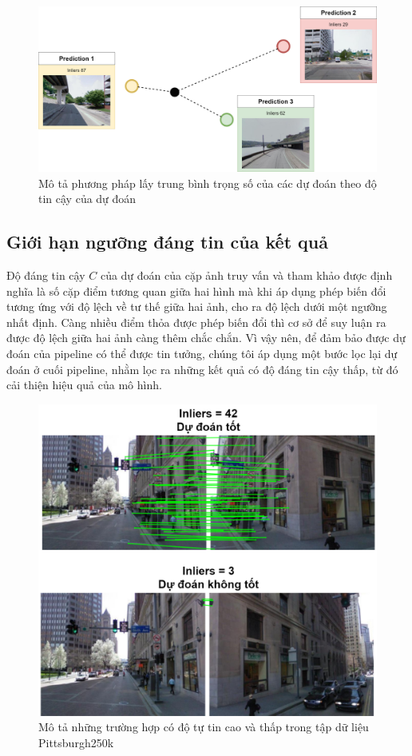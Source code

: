 \begin{figure}[H]
  \centering
  \includegraphics[width=\textwidth]{pics/Proposal/weighted.png}
  \caption[Trung bình trọng số theo inliers của dự đoán]{Mô tả phương pháp lấy trung bình trọng số của các dự đoán theo độ tin cậy của dự đoán}
\end{figure}

\subsection{Giới hạn ngưỡng đáng tin của kết quả}

Độ đáng tin cậy $C$ của dự đoán của cặp ảnh truy vấn và tham khảo được định nghĩa là số cặp điểm tương quan giữa hai hình mà khi áp dụng phép biến đổi tương ứng với độ lệch về tư thế giữa hai ảnh, cho ra độ lệch dưới một ngưỡng nhất định. Càng nhiều điểm thỏa được phép biến đổi thì cơ sở để suy luận ra được độ lệch giữa hai ảnh càng thêm chắc chắn. Vì vậy nên, để đảm bảo được dự đoán của pipeline có thể được tin tưởng, chúng tôi áp dụng một bước lọc lại dự đoán ở cuối pipeline, nhằm lọc ra những kết quả có độ đáng tin cậy thấp, từ đó cải thiện hiệu quả của mô hình.

\begin{figure}[H]
  \centering
  \includegraphics[width=\textwidth]{pics/Proposal/threshold.png}
  \caption[Những dự đoán tốt và không tốt đánh giá theo độ tin cậy]{Mô tả những trường hợp có độ tự tin cao và thấp trong tập dữ liệu Pittsburgh250k \cite{6618963}}
\end{figure}


